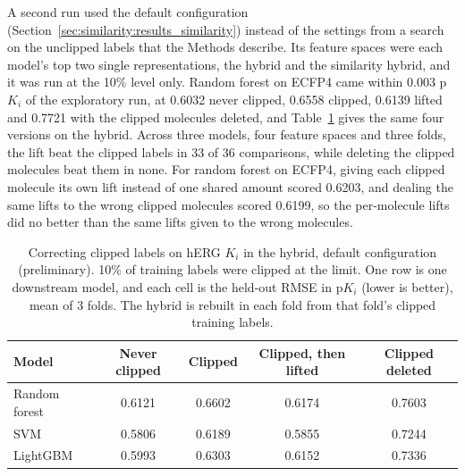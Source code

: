 A second run used the default configuration (Section~\ref{sec:similarity:results_similarity}) instead of the settings from a search on the unclipped labels that the Methods describe. Its feature spaces were each model's top two single representations, the hybrid and the similarity hybrid, and it was run at the 10\% level only. Random forest on ECFP4 came within 0.003 p$K_i$ of the exploratory run, at 0.6032 never clipped, 0.6558 clipped, 0.6139 lifted and 0.7721 with the clipped molecules deleted, and Table~\ref{tab:ch6prelim_censor_hybrid} gives the same four versions on the hybrid. Across three models, four feature spaces and three folds, the lift beat the clipped labels in 33 of 36 comparisons, while deleting the clipped molecules beat them in none. For random forest on ECFP4, giving each clipped molecule its own lift instead of one shared amount scored 0.6203, and dealing the same lifts to the wrong clipped molecules scored 0.6199, so the per-molecule lifts did no better than the same lifts given to the wrong molecules.

\begin{table}[htbp]
\centering
\small
\begin{tabular}{@{}lcccc@{}}
\toprule
Model & Never clipped & Clipped & Clipped, then lifted & Clipped deleted \\
\midrule
Random forest & 0.6121 & 0.6602 & 0.6174 & 0.7603 \\
SVM & 0.5806 & 0.6189 & 0.5855 & 0.7244 \\
LightGBM & 0.5993 & 0.6303 & 0.6152 & 0.7336 \\
\bottomrule
\end{tabular}
\caption[Correcting clipped labels on hERG $K_i$, hybrid (preliminary).]{Correcting clipped labels on hERG $K_i$ in the hybrid, default configuration (preliminary). 10\% of training labels were clipped at the limit. One row is one downstream model, and each cell is the held-out RMSE in p$K_i$ (lower is better), mean of 3 folds. The hybrid is rebuilt in each fold from that fold's clipped training labels.}
\label{tab:ch6prelim_censor_hybrid}
\end{table}



